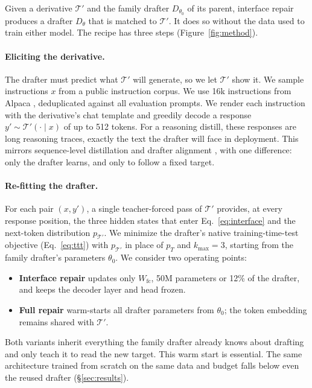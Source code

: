 \documentclass[11pt]{article}
\newcommand{\Tp}{\mathcal{T}'}
\newcommand{\ours}{interface repair}
\begin{document}
Given a derivative $\Tp$ and the family drafter $D_{\theta_0}$ of its parent, \ours{} produces a drafter $D_{\theta}$ that is matched to $\Tp$.
It does so without the data used to train either model.
The recipe has three steps (Figure~\ref{fig:method}).

\paragraph{Eliciting the derivative.}
The drafter must predict what $\Tp$ will generate, so we let $\Tp$ show it.
We sample instructions $x$ from a public instruction corpus.
We use 16k instructions from Alpaca \citep{taori2023alpaca}, deduplicated against all evaluation prompts.
We render each instruction with the derivative's chat template and greedily decode a response $y' \sim \Tp(\cdot \mid x)$ of up to 512 tokens.
For a reasoning distill, these responses are long reasoning traces, exactly the text the drafter will face in deployment.
This mirrors sequence-level distillation \citep{kim2016sequence} and drafter alignment \citep{zhou2024distillspec,goel2024direct}, with one difference: only the drafter learns, and only to follow a fixed target.

\paragraph{Re-fitting the drafter.}
For each pair $(x, y')$, a single teacher-forced pass of $\Tp$ provides, at every response position, the three hidden states that enter Eq.~\eqref{eq:interface} and the next-token distribution $p_{\Tp}$.
We minimize the drafter's native training-time-test objective (Eq.~\ref{eq:ttt}) with $p_{\Tp}$ in place of $p_T$ and $k_{\max} = 3$, starting from the family drafter's parameters $\theta_0$.
We consider two operating points:
\begin{itemize}
  \setlength\itemsep{1pt}
  \item \textbf{Interface repair} updates only $W_{\text{fc}}$, 50M parameters or 12\% of the drafter, and keeps the decoder layer and head frozen.
  \item \textbf{Full repair} warm-starts all drafter parameters from $\theta_0$; the token embedding remains shared with $\Tp$.
\end{itemize}
Both variants inherit everything the family drafter already knows about drafting and only teach it to read the new target.
This warm start is essential.
The same architecture trained from scratch on the same data and budget falls below even the reused drafter (\S\ref{sec:results}).
\end{document}
